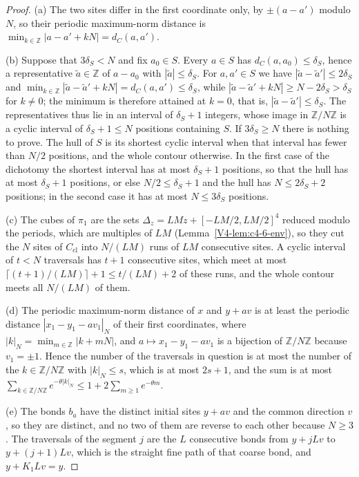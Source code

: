 \documentclass[11pt]{article}
\numberwithin{equation}{section}
\theoremstyle{remark}
\theoremstyle{plain}
\begin{document}
\begin{proof}
(a) The two sites differ in the first coordinate only, by $\pm(a-a')$ modulo $N$, so their periodic maximum-norm distance is $\min_{k\in\mathbb Z}| a-a'+kN|= d_C(a,a')$.

(b) Suppose that $3\delta_S< N$ and fix $a_0\in S$. Every $a\in S$ has $d_C(a,a_0)\leqslant \delta_S$, hence a representative $\tilde a\in\mathbb Z$ of $a-a_0$ with $|\tilde a|\leqslant \delta_S$. For $a,a'\in S$ we have $|\tilde a-\tilde a'|\leqslant 2\delta_S$ and $\min_{k\in\mathbb Z}|\tilde a-\tilde a'+kN|= d_C(a,a')\leqslant \delta_S$, while $|\tilde a-\tilde a'+kN|\geqslant N-2\delta_S>\delta_S$ for $k\neq0$; the minimum is therefore attained at $k=0$, that is, $|\tilde a-\tilde a'|\leqslant \delta_S$. The representatives thus lie in an interval of $\delta_S+1$ integers, whose image in $\mathbb Z/N\mathbb Z$ is a cyclic interval of $\delta_S+1\leqslant N$ positions containing $S$. If $3\delta_S\geqslant N$ there is nothing to prove. The hull of $S$ is its shortest cyclic interval when that interval has fewer than $N/2$ positions, and the whole contour otherwise. In the first case of the dichotomy the shortest interval has at most $\delta_S+1$ positions, so that the hull has at most $\delta_S+1$ positions, or else $N/2\leqslant \delta_S+1$ and the hull has $N\leqslant 2\delta_S+2$ positions; in the second case it has at most $N\leqslant 3\delta_S$ positions.

(c) The cubes of $\pi_1$ are the sets $\Delta_z= LMz+[-LM/2,LM/2]^4$ reduced modulo the periods, which are multiples of $LM$ (Lemma~\ref{V4-lem:c4-6-env}), so they cut the $N$ sites of $C_{\mathrm{cl}}$ into $N/(LM)$ runs of $LM$ consecutive sites. A cyclic interval of $t< N$ traversals has $t+1$ consecutive sites, which meet at most $\lceil(t+1)/(LM)\rceil+1\leqslant t/(LM)+2$ of these runs, and the whole contour meets all $N/(LM)$ of them.

(d) The periodic maximum-norm distance of $x$ and $y+av$ is at least the periodic distance $| x_1-y_1-av_1|_N$ of their first coordinates, where $| k|_N=\min_{m\in\mathbb Z}| k+mN|$, and $a\mapsto x_1-y_1-av_1$ is a bijection of $\mathbb Z/N\mathbb Z$ because $v_1=\pm1$. Hence the number of the traversals in question is at most the number of the $k\in\mathbb Z/N\mathbb Z$ with $| k|_N\leqslant s$, which is at most $2s+1$, and the sum is at most $\sum_{k\in\mathbb Z/N\mathbb Z}e^{-\theta| k|_N}\leqslant 1+2\sum_{m\geqslant 1}e^{-\theta m}$.

(e) The bonds $b_a$ have the distinct initial sites $y+av$ and the common direction $v$, so they are distinct, and no two of them are reverse to each other because $N\geqslant 3$. The traversals of the segment $j$ are the $L$ consecutive bonds from $y+jLv$ to $y+(j+1)Lv$, which is the straight fine path of that coarse bond, and $y+K_1Lv= y$.


\end{proof}
\end{document}
